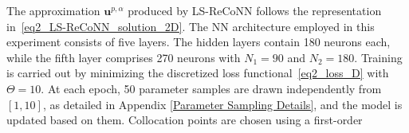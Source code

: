 \documentclass[oneside]{article}
\newcounter{reviewer}
\newcounter{point}[reviewer]
\begin{document}
\noindent The approximation \( \mathbf{u}^{p,\alpha} \) produced by LS-ReCoNN follows the representation in~\eqref{eq2_LS-ReCoNN_solution_2D}. 
The NN architecture employed in this experiment consists of five layers. The hidden layers contain 180 neurons each, while the fifth layer comprises 270 neurons with $N_1 = 90$ and $N_2 = 180$. Training is carried out by minimizing the discretized loss functional~\eqref{eq2_loss_D} with $\Theta = 10$.  At each epoch, 50 parameter samples are drawn independently from \([1,10]\), as detailed in Appendix \ref{Parameter Sampling Details}, and the model is updated based on them.  Collocation points are chosen using a first-order
\begin{figure}[H]
    \centering







        
        
        

\end{figure}
\end{document}
